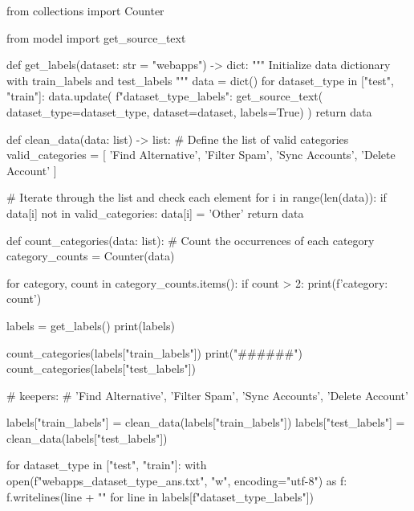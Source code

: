 \begin{python}
from collections import Counter

from model import get_source_text


def get_labels(dataset: str = "webapps") -> dict:
  """ Initialize data dictionary with train_labels and test_labels
  """
  data = dict()
  for dataset_type in ["test", "train"]:
    data.update(
      {f"{dataset_type}_labels": get_source_text(
      dataset_type=dataset_type, dataset=dataset, labels=True)}
    )
  return data


def clean_data(data: list) -> list:
  # Define the list of valid categories
  valid_categories = [
    'Find Alternative', 'Filter Spam', 'Sync Accounts', 'Delete Account'
  ]

  # Iterate through the list and check each element
  for i in range(len(data)):
    if data[i] not in valid_categories:
      data[i] = 'Other'
  return data


def count_categories(data: list):
  # Count the occurrences of each category
  category_counts = Counter(data)

  for category, count in category_counts.items():
    if count > 2:
      print(f'{category}: {count}')


labels = get_labels()
print(labels)

count_categories(labels["train_labels"])
print("######")
count_categories(labels["test_labels"])

# keepers: 
# 'Find Alternative', 'Filter Spam', 'Sync Accounts', 'Delete Account'

labels["train_labels"] = clean_data(labels["train_labels"])
labels["test_labels"] = clean_data(labels["test_labels"])

for dataset_type in ["test", "train"]:
  with open(f"webapps_{dataset_type}_ans.txt", "w", encoding="utf-8") as f:
    f.writelines(line + "\n" for line in labels[f"{dataset_type}_labels"])
\end{python}
